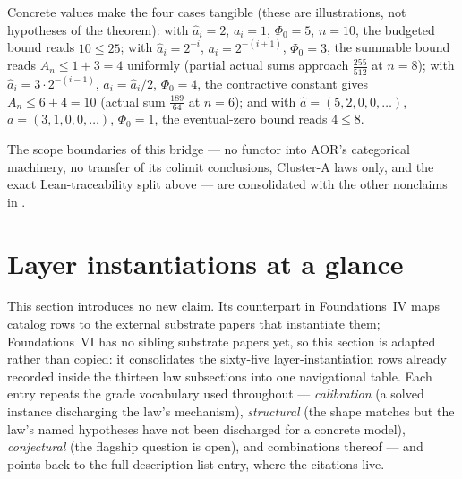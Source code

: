 \documentclass[11pt]{article}
\newcommand{\FVI}{Foundations~VI}
\newcommand{\FoundIV}{Foundations~IV}
\theoremstyle{definition}
\begin{document}
Concrete values make the four cases tangible (these are illustrations, not hypotheses of the
theorem): with $\widehat{a}_i = 2$, $a_i = 1$, $\Phi_0 = 5$, $n = 10$, the budgeted bound reads
$10 \le 25$; with $\widehat{a}_i = 2^{-i}$, $a_i = 2^{-(i+1)}$, $\Phi_0 = 3$, the summable bound
reads $A_n \le 1 + 3 = 4$ uniformly (partial actual sums approach $\tfrac{255}{512}$ at $n = 8$);
with $\widehat{a}_i = 3 \cdot 2^{-(i-1)}$, $a_i = \widehat{a}_i / 2$, $\Phi_0 = 4$, the contractive
constant gives $A_n \le 6 + 4 = 10$ (actual sum $\tfrac{189}{64}$ at $n = 6$); and with
$\widehat{a} = (5, 2, 0, 0, \ldots)$, $a = (3, 1, 0, 0, \ldots)$, $\Phi_0 = 1$, the eventual-zero
bound reads $4 \le 8$.

The scope boundaries of this bridge --- no functor into AOR's categorical machinery, no transfer of
its colimit conclusions, Cluster-A laws only, and the exact Lean-traceability split above --- are
consolidated with the other nonclaims in .

\section{Layer instantiations at a glance}\label{sec:instantiations-glance}

This section introduces no new claim. Its counterpart in \FoundIV{} maps catalog rows to the external
substrate papers that instantiate them; \FVI{} has no sibling substrate papers yet, so this section is
adapted rather than copied: it consolidates the sixty-five layer-instantiation rows already recorded
inside the thirteen law subsections into one navigational table. Each entry repeats the grade
vocabulary used throughout --- \emph{calibration} (a solved instance discharging the law's mechanism),
\emph{structural} (the shape matches but the law's named hypotheses have not been discharged for a
concrete model), \emph{conjectural} (the flagship question is open), and combinations thereof --- and
points back to the full description-list entry, where the citations live.
\end{document}
